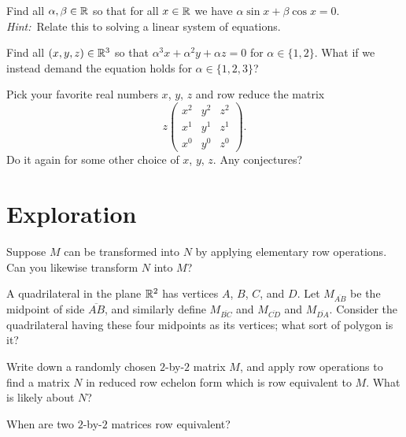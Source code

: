 \documentclass{homework}
\begin{document}
\begin{problem}
  Find all $\alpha, \beta \in \mathbb{R}$ so that for all $x \in \mathbb{R}$ we have $\alpha \sin x + \beta \cos x = 0$.  \textit{Hint:}~Relate this to solving a linear system of equations.
\end{problem}

\begin{problem}
  Find all $(x,y,z) \in \mathbb{R}^3$ so that $\alpha^3 x + \alpha^2 y + \alpha z = 0$ for $\alpha \in \{1,2\}$.  What if we instead demand the equation holds for $\alpha \in \{1,2,3\}$?
\end{problem}

\begin{problem}
  Pick your favorite real numbers $x$, $y$, $z$ and row reduce the matrix
  \[z
    \begin{pmatrix}
      x^2 & y^2 & z^2 \\
      x^1 & y^1 & z^1 \\
      x^0 & y^0 & z^0            
    \end{pmatrix}.
  \]
  Do it again for some other choice of $x$, $y$, $z$.  Any conjectures?
\end{problem}

\section{Exploration}

\begin{problem}
  Suppose $M$ can be transformed into $N$ by applying elementary row
  operations.  Can you likewise transform $N$ into $M$?
\end{problem}

\begin{problem}
  A quadrilateral in the plane $\mathbb{R}^2$ has vertices $A$, $B$, $C$, and
  $D$.  Let $M_{\overline{AB}}$ be the midpoint of side
  $\overline{AB}$, and similarly define $M_{\overline{BC}}$ and
  $M_{\overline{CD}}$ and $M_{\overline{DA}}$.  Consider the
  quadrilateral having these four midpoints as its vertices; what sort
  of polygon is it?
\end{problem}

\begin{problem}
  Write down a randomly chosen $2$-by-$2$ matrix $M$, and apply row
  operations to find a matrix $N$ in reduced row echelon form which is row
  equivalent to $M$.  What is likely about $N$?
\end{problem}

\begin{problem}
  When are two $2$-by-$2$ matrices row equivalent?
\end{problem}
\end{document}
